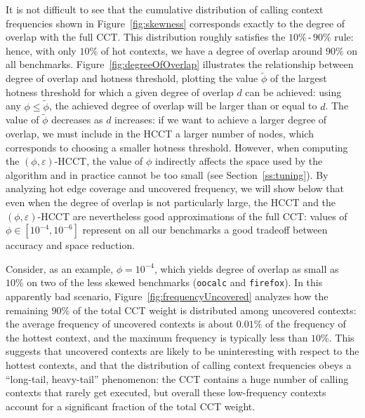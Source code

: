 \documentclass[preprint]{sigplanconf}
\begin{document}
It is not difficult to see that the cumulative distribution  of calling context frequencies shown in Figure~\ref{fig:skewness} corresponds exactly to the degree of overlap with the full CCT. This distribution roughly satisfies the $10\%\,$-$\,90\%$ rule: hence, with only $10\%$ of hot contexts, we have a degree of overlap around $90\%$ on all benchmarks. Figure~\ref{fig:degreeOfOverlap} illustrates the relationship between degree of overlap and hotness threshold, plotting the value $\widetilde\phi$ of the largest hotness threshold  for which a given degree of overlap $d$ can be achieved: using any $\phi\leq\widetilde\phi$, the achieved degree of overlap will be larger than or equal to $d$. The value of $\widetilde\phi$ decreases as $d$ increases: if we want to achieve a larger degree of overlap, we must include in the HCCT a larger number of nodes, which corresponds to choosing a smaller hotness threshold. However, when computing the $(\phi,\varepsilon)$-HCCT, the value of $\phi$ indirectly affects the space used by the algorithm and in practice cannot be too small (see Section~\ref{ss:tuning}). By analyzing hot edge coverage and uncovered frequency, we will show below that even when the degree of overlap is not particularly large, the HCCT and the $(\phi,\varepsilon)$-HCCT are nevertheless good approximations of the full CCT: values of $\phi\in[10^{-4},10^{-6}]$ represent on all our benchmarks a good tradeoff between accuracy and space reduction.


Consider, as an example, $\phi=10^{-4}$, which yields degree of overlap as small as $10\%$ on two of the less skewed benchmarks ({\tt oocalc} and {\tt firefox}). In this apparently bad scenario, Figure~\ref{fig:frequencyUncovered} analyzes how the remaining $90\%$ of the total CCT weight is distributed among uncovered contexts: the average frequency of uncovered contexts is about $0.01\%$ of the frequency of the hottest context, and the maximum frequency is typically less than $10\%$. This suggests that uncovered contexts are likely to be uninteresting with respect to the hottest contexts, and that the distribution of calling context frequencies obeys a ``long-tail, heavy-tail'' phenomenon: the CCT contains a huge number of calling contexts that rarely get executed, but overall these low-frequency contexts account for a significant fraction of the total CCT weight. 
\end{document}
